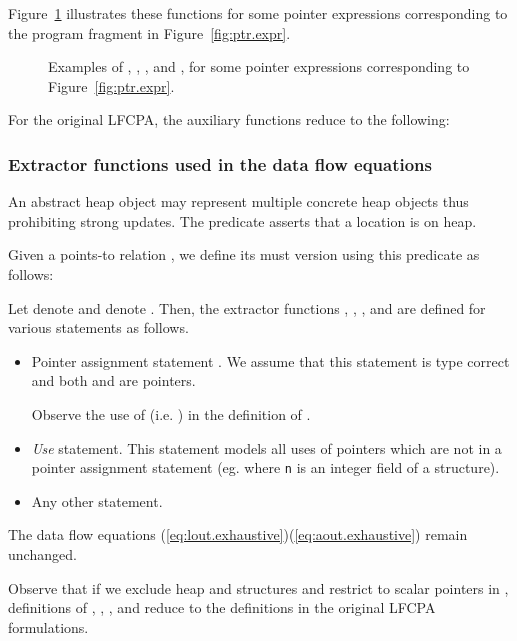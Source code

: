 \documentclass[a4paper,11pt,fleqn]{article}
\newcommand{\pointer}{\text{\sf\em P\/}\xspace}
\begin{document}
Figure~\ref{fig:aux.fn.exmp} illustrates these functions for 
some pointer expressions corresponding to the program fragment in Figure~\protect\ref{fig:ptr.expr}.

\begin{figure}[t]
\begin{center}
\alpha
\end{center}
\caption{Examples of \lval, \rval, \derefp, and , for some pointer expressions corresponding to Figure~\protect\ref{fig:ptr.expr}.}
\label{fig:aux.fn.exmp}
\end{figure}


For the original LFCPA, the auxiliary functions reduce to the following:



\newcommand{\ma}{\text{\em mA\/}\xspace}

\subsubsection*{Extractor functions used in the data flow equations}
An abstract heap object may represent multiple concrete heap objects thus
prohibiting strong updates. The predicate \text{} asserts
that a location  is on heap.  

Given a points-to relation \text{},
we define its must version using this predicate as follows:



Let  denote  and \ma denote \text{} . Then,
the extractor functions , , , and  are defined for various statements
as follows. 
\begin{itemize}
\item Pointer assignment statement \text{}. We assume that this statement is type correct and both 
 and  are pointers.

Observe the use of  \ma (i.e. \text{}) in the definition of .


\item {\em Use\/}  statement. This statement models all uses of pointers which are 
      not in a pointer assignment statement (eg.  where {\tt n} is an integer field of a structure).
	
\item Any other statement.

\end{itemize}

The data flow equations (\ref{eq:lout.exhaustive})(\ref{eq:aout.exhaustive}) remain unchanged.

Observe that if we exclude heap and structures and restrict  to scalar pointers in \pointer, 
definitions \text{(\ref{eq:def.heap})(\ref{eq:anu.other.heap})} of
, , , and  reduce to the definitions in the original LFCPA formulations.
\end{document}
